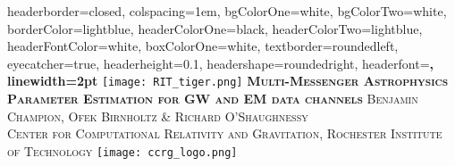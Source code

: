 \documentclass[landscape,a0paper,fontscale=0.285]{baposter} %
\begin{document}
\begin{poster}
{
headerborder=closed, %
colspacing=1em, %
bgColorOne=white, %
bgColorTwo=white, %
borderColor=lightblue, %
headerColorOne=black, %
headerColorTwo=lightblue, %
headerFontColor=white, %
boxColorOne=white, %
textborder=roundedleft, %
eyecatcher=true, %
headerheight=0.1\textheight, %
headershape=roundedright, %
headerfont=\Large\bf\textsc, %
linewidth=2pt %
}
%
{\texttt{[image: RIT\_tiger.png]}} %
{\bf\textsc{Multi-Messenger Astrophysics Parameter Estimation for GW
and EM data channels}\vspace{-0.1em}} %
{\textsc{ Benjamin Champion, Ofek Birnholtz \& Richard O'Shaughnessy \\
	\hspace{12pt} Center for Computational Relativity and Gravitation, Rochester Institute of Technology}}
{\texttt{[image: ccrg\_logo.png]}} %


\end{poster}
\end{document}

